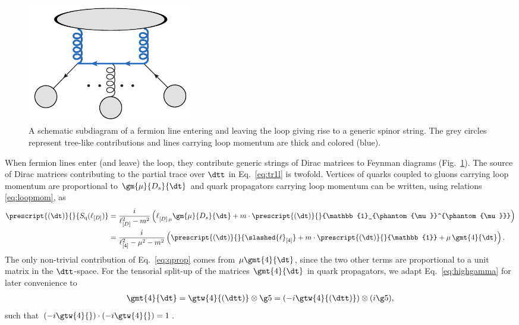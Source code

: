 \begin{figure}%
  \centering
  \includegraphics[width=0.35\textwidth]{figures/protochain}
  \caption{A schematic subdiagram of a fermion line entering and
    leaving the loop giving rise to a generic spinor string. The grey circles represent tree-like
    contributions and lines carrying loop momentum are thick and colored (blue).}
  \label{fig:spinchain}
\end{figure}
When fermion lines enter (and leave) the loop, they
contribute generic strings of Dirac matrices to Feynman diagrams
(Fig.~\ref{fig:spinchain}). The source of Dirac matrices contributing
to the partial trace over $\dtt$ in Eq.~\eqref{eq:tr1l} is twofold. Vertices of quarks coupled to
gluons carrying loop momentum are proportional to $\gm{\mu}{D_s}{\dt}$
and quark propagators carrying loop momentum can be written, using relations \eqref{eq:loopmom}, as
\begin{align}\label{eq:qprop}
 \prescript{(\dt)}{}{ S_{\text{q}}(\ell_{[D]})}&=
 \frac{i}{\ell^2_{[D]}-m^2}\left(\ell^{\phantom{\mu}}_{[D]\,\mu}\gm{\mu}{D_s}{\dt}+m\cdot\prescript{(\dt)}{}{\mathbb{1}_{\phantom{\mu}}^{\phantom{\mu}}}\right)\\
&= 
  \frac{i}{\ell^2_{[4]}-\mu^2-m^2}\left( \prescript{(\dt)}{}{\slashed{\ell}_{[4]}} +m\cdot\prescript{(\dt)}{}{\mathbb{1}} + \mu\,\gmt{4}{\dt} \right).
\end{align}
The only non-trivial contribution of Eq.~\eqref{eq:qprop} comes from $\mu\gmt{4}{\dt}$,
since the two other terms are proportional to a
unit matrix in the $\dtt$-space. For the tensorial split-up of the matrices $\gmt{4}{\dt}$ in quark propagators, we adapt Eq.~\eqref{eq:highgamma} for later convenience to  
\begin{align}\label{eq:prohg}
\gmt{4}{\dt} = \gtw{4}{(\dtt)} \otimes  {\g5} =  \left(-i\gtw{4}{(\dtt)} \right) \otimes  (i{\g5}),
\end{align}
such that $(-i\gtw{4}{})\cdot(-i\gtw{4}{})=1$.

